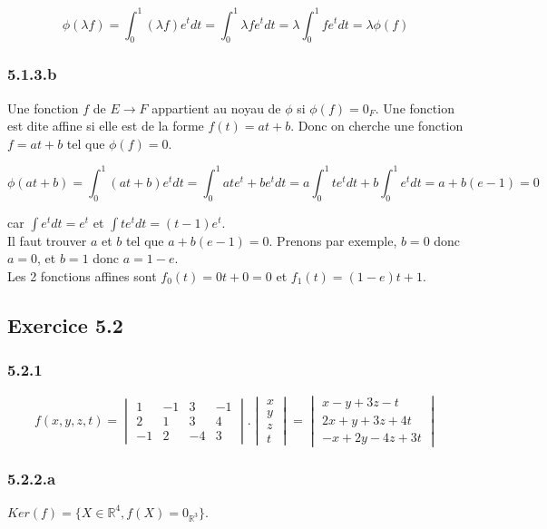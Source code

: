 \documentclass[]{book}
\theoremstyle{definition}
\newcommand{\bb}[1]{\mathbb{#1}}
\newcommand{\R}{\bb{R}}
\begin{document}
$$
\phi(\lambda f) = \int_0^1{(\lambda f)e^t dt} = \int_0^1{ \lambda f e^t dt} =  \lambda \int_0^1{f e^t dt} = \lambda \phi(f)
$$

\subsubsection*{5.1.3.b}
Une fonction $f$ de $E \to F$ appartient au noyau de $\phi$ si $\phi(f) = 0_F$. Une fonction est dite affine si elle est de la forme $f(t) = at + b$. Donc on cherche une fonction $f=at+b$ tel que $\phi(f)=0$.

$$
\phi(at+b) = \int_0^1{(at+b)e^t dt} = \int_0^1{at e^t + b e^t dt} = a\int_0^1{t e^t dt} + b\int_0^1{e^t dt} = a + b(e-1) = 0
$$

car $\int{e^t dt} = e^t$ et $\int{t e^t dt} = (t-1)e^t$.\\

Il faut trouver $a$ et $b$ tel que $a+b(e-1) = 0$. Prenons par exemple, $b=0$ donc $a=0$, et $b=1$ donc $a = 1-e$.\\
Les 2 fonctions affines sont $f_0(t) = 0t+0 = 0$ et $f_1(t) = (1-e)t + 1$.\\


\subsection*{Exercice 5.2}
\subsubsection*{5.2.1}
$$
f(x,y,z,t)=
\begin{vmatrix} 1 & -1 & 3 & -1 \\ 2 & 1 & 3 & 4 \\ -1 & 2 & -4 & 3\end{vmatrix} .
\begin{vmatrix} x \\ y \\ z \\ t \end{vmatrix} = 
\begin{vmatrix} x -y +3z -t \\ 2x + y + 3z + 4t \\ -x + 2y -4z + 3t \end{vmatrix} 
$$

\subsubsection*{5.2.2.a}
$Ker(f) = \{ X \in \R^4, f(X) = 0_{\R^3}\}$.\\
\end{document}
